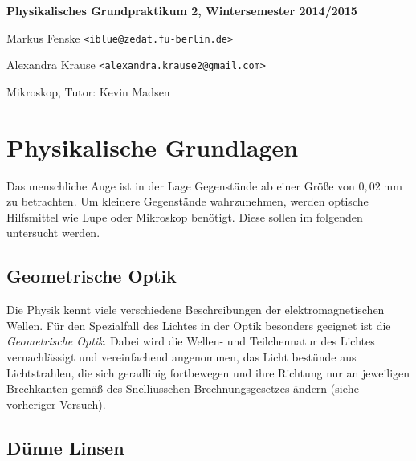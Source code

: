 \documentclass[a4paper,german,12pt,smallheadings]{scrartcl}
\begin{document}
\begin{titlepage}

\end{titlepage}

\allowdisplaybreaks %
\begin{center}
\bfseries %
\sffamily %
\vspace{-40pt}
Physikalisches Grundpraktikum 2, Wintersemester 2014/2015

Markus Fenske \texttt{<iblue@zedat.fu-berlin.de>}

Alexandra Krause \texttt{<alexandra.krause2@gmail.com>}

Mikroskop, Tutor: Kevin Madsen
\vspace{-10pt}
\end{center}

\section{Physikalische Grundlagen}

Das menschliche Auge ist in der Lage Gegenstände ab einer Größe von $0{,}02
\operatorname{mm}$ zu betrachten. Um kleinere Gegenstände wahrzunehmen, werden
optische Hilfsmittel wie Lupe oder Mikroskop benötigt. Diese sollen im
folgenden untersucht werden.

\subsection{Geometrische Optik}

Die Physik kennt viele verschiedene Beschreibungen der elektromagnetischen
Wellen. Für den Spezialfall des Lichtes in der Optik besonders geeignet ist die
\textit{Geometrische Optik}. Dabei wird die Wellen- und Teilchennatur des
Lichtes vernachlässigt und vereinfachend angenommen, das Licht bestünde aus
Lichtstrahlen, die sich geradlinig fortbewegen und ihre Richtung nur an
jeweiligen Brechkanten gemäß des Snelliusschen Brechnungsgesetzes ändern (siehe
vorheriger Versuch).

\subsection{Dünne Linsen}
\end{document}

